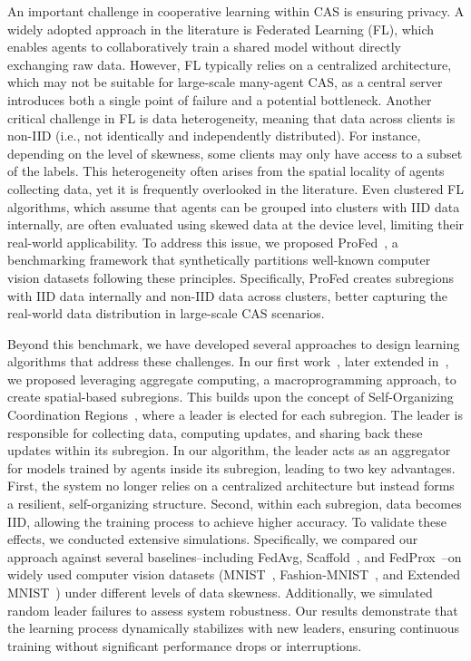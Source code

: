\documentclass[12pt]{article}
\begin{document}
An important challenge in cooperative learning within CAS is ensuring privacy.
%
A widely adopted approach in the literature is Federated Learning (FL), which enables agents 
 to collaboratively train a shared model without directly exchanging raw data. 
% 
However, FL typically relies on a centralized architecture, which may not be suitable for large-scale many-agent CAS, 
 as a central server introduces both a single point of failure and a potential bottleneck.
%
Another critical challenge in FL is data heterogeneity, meaning that data across clients is non-IID 
 (i.e., not identically and independently distributed). 
% 
For instance, depending on the level of skewness, some clients may only have access to a subset of the labels. 
%
This heterogeneity often arises from the spatial locality of agents collecting data, yet it is frequently 
 overlooked in the literature. 
% 
Even clustered FL algorithms, which assume that agents can be grouped into clusters with IID data internally, 
 are often evaluated using skewed data at the device level, limiting their real-world applicability.
%
To address this issue, we proposed ProFed~\cite{DBLP:conf/ijcnn/DominiAV2025}, a benchmarking framework that synthetically 
 partitions well-known computer vision datasets following these principles. 
% 
Specifically, ProFed creates subregions with IID data internally and non-IID data across clusters, better capturing the 
 real-world data distribution in large-scale CAS scenarios.

Beyond this benchmark, we have developed several approaches to design learning algorithms that address these challenges. 
%
In our first work~\cite{DBLP:conf/coordination/DominiAEV24}, later extended in~\cite{domini2025fbflfieldbasedcoordinationapproach}, 
 we proposed leveraging aggregate computing, a macroprogramming approach, to create spatial-based subregions. 
% 
This builds upon the concept of Self-Organizing Coordination Regions~\cite{DBLP:conf/coordination/CasadeiPVN19}, 
 where a leader is elected for each subregion.
%
The leader is responsible for collecting data, computing updates, and sharing back these updates within its subregion.
%
In our algorithm, the leader acts as an aggregator for models trained by agents inside its subregion, leading to two key advantages. 
%
First, the system no longer relies on a centralized architecture but instead forms a resilient, self-organizing structure. 
%
Second, within each subregion, data becomes IID, allowing the training process to achieve higher accuracy.
%
To validate these effects, we conducted extensive simulations. 
%
Specifically, we compared our approach against several baselines--including FedAvg, 
 Scaffold~\cite{DBLP:conf/icml/KarimireddyKMRS20}, and FedProx~\cite{DBLP:conf/mlsys/LiSZSTS20}--on 
 widely used computer vision datasets (MNIST~\cite{lecun2010mnist}, Fashion-MNIST~\cite{DBLP:journals/corr/abs-1708-07747}, 
 and Extended MNIST~\cite{DBLP:journals/corr/CohenATS17}) under different levels of data skewness. 
% 
Additionally, we simulated random leader failures to assess system robustness. 
%
Our results demonstrate that the learning process dynamically stabilizes with new leaders, ensuring continuous training without 
 significant performance drops or interruptions.
\end{document}
